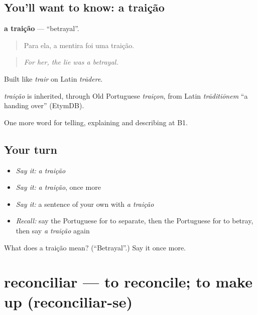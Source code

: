 \subsection*{You'll want to know: a traição}
\textbf{a traição} — \textquotedblleft{}betrayal\textquotedblright{}.

\begin{quote}
Para ela, a mentira foi uma traição.
\end{quote}

\begin{quote}
\emph{For her, the lie was a betrayal.}
\end{quote}

Built like \emph{trair} on Latin \emph{trādere}.

\begin{cousinweb}
\emph{traição} is inherited, through Old Portuguese \emph{traiçon}, from Latin \emph{trāditiōnem} \textquotedblleft{}a handing over\textquotedblright{} (EtymDB).
\end{cousinweb}

\begin{grammarlens}[title={What you've built}]
One more word for telling, explaining and describing at B1.
\end{grammarlens}

\subsection*{Your turn}
\begin{itemize}
\raggedright
  \item \emph{Say it:} \emph{a traição}
  \item \emph{Say it:} \emph{a traição}, once more
  \item \emph{Say it:} a sentence of your own with \emph{a traição}
  \item \emph{Recall:} say the Portuguese for to separate, then the Portuguese for to betray, then say \emph{a traição} again
\end{itemize}

\begin{tcolorbox}[breakable,colback=teal!4,colframe=teal!35!black,title={Before you move on}]
What does a traição mean? (\textquotedblleft{}Betrayal\textquotedblright{}.) Say it once more.
\end{tcolorbox}
\section[reconciliar]{reconciliar — to reconcile; to make up (reconciliar-se)}

